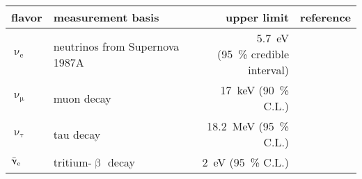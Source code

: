 \begin{table}
	\centering
	\label{tab:neutrinoPhysicsAbsoluteNuMassMeasurementKinLimits}
		\begin{tabular}{llrr}
		\toprule
		flavor & measurement basis & upper limit & reference \\
		\hline
		$\upnu_\mathrm{e}$ &
		neutrinos from Supernova 1987A &
		\makecell[r]{\SI{5.7}{eV}\\(\SI{95}{\percent} credible interval)} &
		\cite{Loredo2002} \\
		$\upnu_\upmu$ &
		muon decay &
		\SI{17}{keV} (\SI{90}{\percent} C.L.) &
		\cite{Assamagan1996} \\
		$\upnu_\uptau$ &
		tau decay &
		\SI{18.2}{MeV} (\SI{95}{\percent} C.L.) &
		\cite{Barate:1997zg} \\
		$\bar{\upnu}_{\mathrm{e}}$ &
		tritium-$\upbeta$ decay &
		\SI{2}{eV} (\SI{95}{\percent} C.L.) &
		\cite{Kraus2005, Aseev:2011dq, ReviewOfParticlePhysics} \\
		\bottomrule
	\end{tabular}
\end{table}


